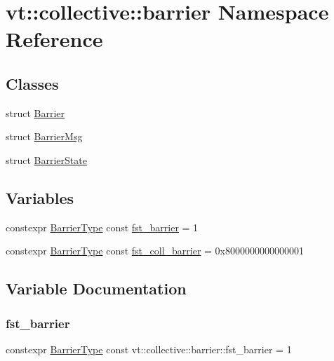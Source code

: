 \hypertarget{namespacevt_1_1collective_1_1barrier}{}\section{vt\+:\+:collective\+:\+:barrier Namespace Reference}
\label{namespacevt_1_1collective_1_1barrier}
\subsection*{Classes}
\begin{DoxyCompactItemize}
\item 
struct \hyperlink{structvt_1_1collective_1_1barrier_1_1_barrier}{Barrier}
\item 
struct \hyperlink{structvt_1_1collective_1_1barrier_1_1_barrier_msg}{Barrier\+Msg}
\item 
struct \hyperlink{structvt_1_1collective_1_1barrier_1_1_barrier_state}{Barrier\+State}
\end{DoxyCompactItemize}
\subsection*{Variables}
\begin{DoxyCompactItemize}
\item 
constexpr \hyperlink{namespacevt_a25e481f0d6bbc7204db23d1c87a62e77}{Barrier\+Type} const \hyperlink{namespacevt_1_1collective_1_1barrier_a43d35d830e81f62b5dfb571ce5e0939e}{fst\+\_\+barrier} = 1
\item 
constexpr \hyperlink{namespacevt_a25e481f0d6bbc7204db23d1c87a62e77}{Barrier\+Type} const \hyperlink{namespacevt_1_1collective_1_1barrier_a02bc7e6a890bd33f1e0b1b264326099c}{fst\+\_\+coll\+\_\+barrier} = 0x8000000000000001
\end{DoxyCompactItemize}


\subsection{Variable Documentation}
\mbox{\label{namespacevt_1_1collective_1_1barrier_a43d35d830e81f62b5dfb571ce5e0939e}} 
\subsubsection{\texorpdfstring{fst\+\_\+barrier}{fst\_barrier}}
{\footnotesize\ttfamily constexpr \hyperlink{namespacevt_a25e481f0d6bbc7204db23d1c87a62e77}{Barrier\+Type} const vt\+::collective\+::barrier\+::fst\+\_\+barrier = 1}

